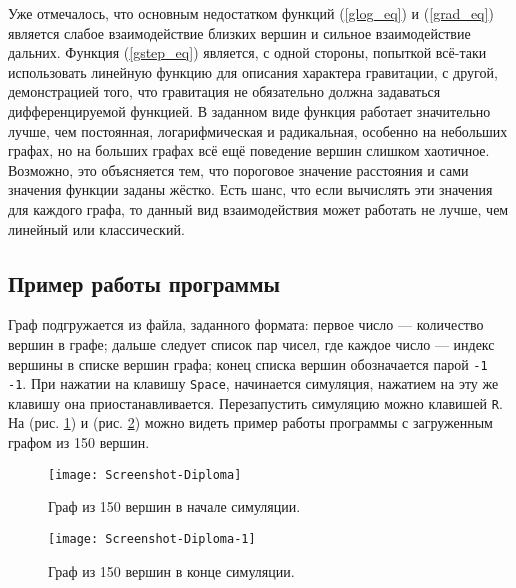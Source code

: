     Уже отмечалось, что основным недостатком функций (\ref{glog_eq}) и (\ref{grad_eq})
    является слабое взаимодействие близких вершин и сильное взаимодействие дальних.
    Функция (\ref{gstep_eq}) является, с одной стороны, попыткой всё-таки использовать линейную
    функцию для описания характера гравитации, с другой, демонстрацией того, что
    гравитация не обязательно должна задаваться дифференцируемой функцией.
    В заданном виде функция работает значительно лучше, чем постоянная, логарифмическая
    и радикальная, особенно на небольших графах, но на больших графах всё ещё поведение
    вершин слишком хаотичное.
    Возможно, это объясняется тем, что пороговое значение расстояния и сами значения
    функции заданы жёстко.
    Есть шанс, что если вычислять эти значения для каждого графа, то данный вид
    взаимодействия может работать не лучше, чем линейный или классический.



  \subsection{Пример работы программы}
    Граф подгружается из файла, заданного формата: первое число --- количество 
    вершин в графе; дальше следует список пар чисел, где каждое число --- индекс
    вершины в списке вершин графа; конец списка вершин обозначается парой 
    \lstinline{-1 -1}.
    При нажатии на клавишу \lstinline{Space}, начинается симуляция, нажатием на
    эту же клавишу она приостанавливается.
    Перезапустить симуляцию можно клавишей \lstinline{R}.
    На (рис. \ref{start_pic}) и (рис. \ref{end_pic}) можно видеть пример работы программы с
    загруженным графом из 150 вершин.
    \begin{figure}[h]
      \centering
      \texttt{[image: Screenshot-Diploma]}
      \caption{Граф из 150 вершин в начале симуляции.}
      \label{start_pic}
    \end{figure}

    \begin{figure}[h]
      \centering
      \texttt{[image: Screenshot-Diploma-1]}
      \caption{Граф из 150 вершин в конце симуляции.}
      \label{end_pic}
    \end{figure}

